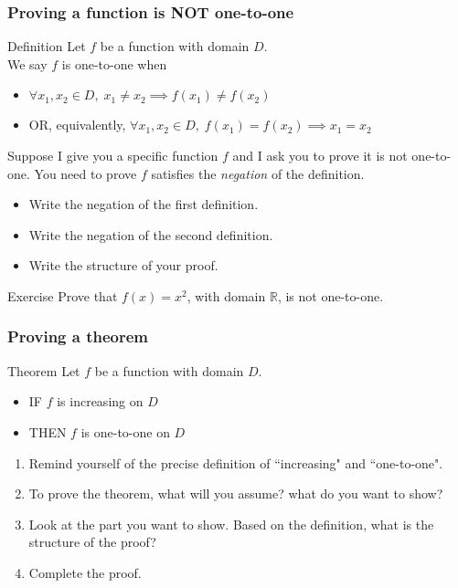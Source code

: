 \documentclass[14pt]{beamer}
\newcommand {\DS} [1] {${\displaystyle #1}$}
\newcommand {\R}{\mathbb{R}}
\newcommand{\p}{\pause}
\begin{document}
\begin{frame}[t]
\fontsize{13}{13}\selectfont
\frametitle{Proving a function is NOT one-to-one}

\begin{block}{Definition}
Let $f$ be a function with domain $D$. \\
We say $f$ is one-to-one when 
	\begin{itemize} 
		\item   \hfill \DS{\forall x_1, x_2 \in D, \; x_1 \neq x_2 \implies  f(x_1) \neq f(x_2)}
		\item    OR, equivalently, \hfill  \DS{\forall x_1, x_2 \in D, \; f(x_1) = f(x_2) \implies x_1 = x_2}
	\end{itemize}
\end{block}

\vfill  \p

Suppose I give you a specific function $f$ and I ask you to prove it is not one-to-one. \pause  You need to prove $f$ satisfies the \emph{negation} of the definition.
	\begin{itemize}
		\item  Write the negation of the first definition.
		\item  Write the negation of the second definition.
		\item  Write the structure of your proof. 
	\end{itemize}
	
\vfill	 \p

\begin{block}{Exercise}
	Prove that $f(x) =  x^2$, with domain $\R$, is not one-to-one.
\end{block}

\end{frame}


\begin{frame}
\frametitle{Proving a theorem}

\begin{block}{Theorem}
	Let $f$ be a function with domain $D$.
		\begin{itemize}
			\item  IF $f$ is increasing on \DS{D}
			\item  THEN $f$ is one-to-one on \DS{D}
		\end{itemize}
\end{block}

\vfill  \p

\begin{enumerate}
	\item  Remind yourself of the precise definition of ``increasing" and ``one-to-one". \p
	\item  To prove the theorem, what will you assume?  what do you want to show? \p
	\item   Look at the part you want to show.  Based on the definition, what is the structure of the proof? \p
	\item   Complete the proof. 
\end{enumerate}

\end{frame}
\end{document}
